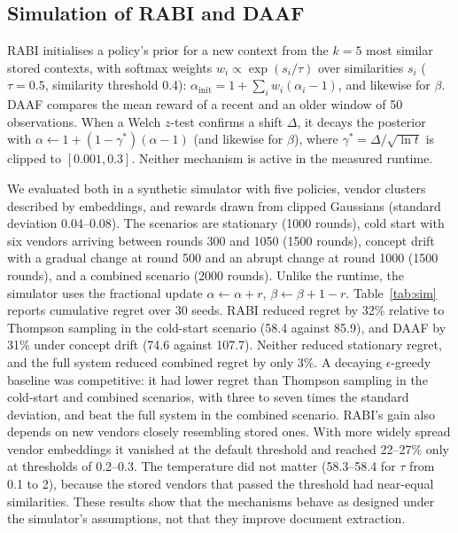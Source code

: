 \documentclass[conference,a4paper]{IEEEtran}
\begin{document}
\subsection{Simulation of RABI and DAAF}
\label{sec:simulation}
RABI initialises a policy's prior for a new context from the $k=5$ most similar stored contexts, with softmax weights $w_i \propto \exp(s_i/\tau)$ over similarities $s_i$ ($\tau=0.5$, similarity threshold 0.4): $\alpha_{\text{init}} = 1 + \sum_i w_i(\alpha_i - 1)$, and likewise for $\beta$. DAAF compares the mean reward of a recent and an older window of 50 observations. When a Welch $z$-test confirms a shift $\Delta$, it decays the posterior with $\alpha \leftarrow 1 + (1-\gamma^*)(\alpha - 1)$ (and likewise for $\beta$), where $\gamma^* = \Delta/\sqrt{\ln t}$ is clipped to $[0.001, 0.3]$. Neither mechanism is active in the measured runtime.

We evaluated both in a synthetic simulator with five policies, vendor clusters described by embeddings, and rewards drawn from clipped Gaussians (standard deviation 0.04--0.08). The scenarios are stationary (1000 rounds), cold start with six vendors arriving between rounds 300 and 1050 (1500 rounds), concept drift with a gradual change at round 500 and an abrupt change at round 1000 (1500 rounds), and a combined scenario (2000 rounds). Unlike the runtime, the simulator uses the fractional update $\alpha \leftarrow \alpha + r$, $\beta \leftarrow \beta + 1 - r$. Table~\ref{tab:sim} reports cumulative regret over 30 seeds. RABI reduced regret by 32\% relative to Thompson sampling in the cold-start scenario (58.4 against 85.9), and DAAF by 31\% under concept drift (74.6 against 107.7). Neither reduced stationary regret, and the full system reduced combined regret by only 3\%. A decaying $\epsilon$-greedy baseline was competitive: it had lower regret than Thompson sampling in the cold-start and combined scenarios, with three to seven times the standard deviation, and beat the full system in the combined scenario. RABI's gain also depends on new vendors closely resembling stored ones. With more widely spread vendor embeddings it vanished at the default threshold and reached 22--27\% only at thresholds of 0.2--0.3. The temperature did not matter (58.3--58.4 for $\tau$ from 0.1 to 2), because the stored vendors that passed the threshold had near-equal similarities. These results show that the mechanisms behave as designed under the simulator's assumptions, not that they improve document extraction.
\end{document}
